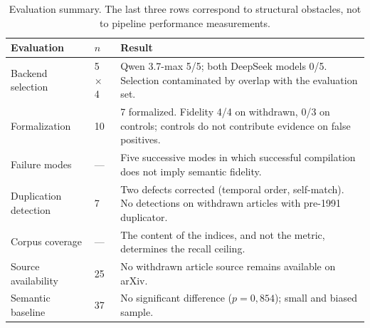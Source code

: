 \begin{table}[htbp]
\centering
\small
\setlength{\tabcolsep}{4pt}
\renewcommand{\arraystretch}{1.15}
\begin{tabular}{p{3.6cm}p{1.6cm}p{8.6cm}}
\toprule
Evaluation & $n$ & Result \\
\midrule
Backend selection & 5 $\times$ 4 & Qwen 3.7-max 5/5; both DeepSeek models 0/5. Selection contaminated by overlap with the evaluation set. \\
\addlinespace
Formalization & 10 & 7 formalized. Fidelity 4/4 on withdrawn, 0/3 on controls; controls do not contribute evidence on false positives. \\
\addlinespace
Failure modes & --- & Five successive modes in which successful compilation does not imply semantic fidelity. \\
\addlinespace
Duplication detection & 7 & Two defects corrected (temporal order, self-match). No detections on withdrawn articles with pre-1991 duplicator. \\
\addlinespace
Corpus coverage & --- & The content of the indices, and not the metric, determines the recall ceiling. \\
\addlinespace
Source availability & 25 & No withdrawn article source remains available on arXiv. \\
\addlinespace
Semantic baseline & 37 & No significant difference ($p = 0{,}854$); small and biased sample. \\
\bottomrule
\end{tabular}
\caption{Evaluation summary. The last three rows correspond to structural obstacles, not to pipeline performance measurements.}
\label{tab:resumen}
\end{table}